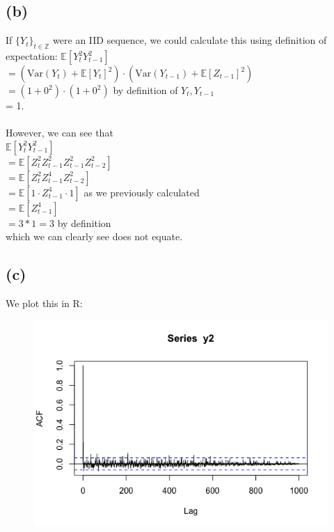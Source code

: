 \documentclass{article}
\begin{document}
{\subsection*{(b)}

If $\{Y_t\}_{t \in \mathbb{Z}}$ were an IID sequence, we could calculate this using definition of expectation:
$\mathbb{E}[Y_t^2Y_{t-1}^2]$ \\ 
$= (\text{Var}(Y_t) + \mathbb{E}[Y_t]^2) \cdot (\text{Var}(Y_{t-1}) + \mathbb{E}[Z_{t-1}]^2)$ \\
$= (1 + 0^2) \cdot (1 + 0^2)$ \hfill by definition of $Y_t, Y_{t-1}$ \\ 
= 1. \\ \\ 
However, we can see that \\
$\mathbb{E}[Y_t^2Y_{t-1}^2]$ \\
$= \mathbb{E}[Z_t^2Z_{t-1}^2Z_{t-1}^2Z_{t-2}^2]$ \\
$= \mathbb{E}[Z_t^2Z_{t-1}^4Z_{t-2}^2]$ \\
$= \mathbb{E}[1 \cdot Z_{t-1}^4 \cdot 1]$ \hfill as we previously calculated \\
$= \mathbb{E}[Z_{t-1}^4]$ \\ 
$= 3 * 1 = 3$ \hfill by definition \\ 
which we can clearly see does not equate. 

\newpage

\subsection*{(c)}

We plot this in R: 
\begin{figure}[h!]
  \centering
  \includegraphics[width=500pt]{hw4_1c.png}
\end{figure}

\newpage

}
\end{document}
